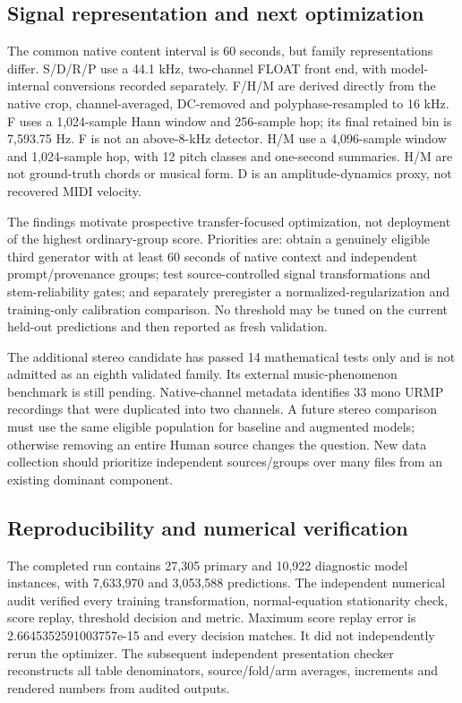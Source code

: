 \subsection{Signal representation and next optimization}

The common native content interval is 60 seconds, but family representations differ. S/D/R/P use a 44.1 kHz, two-channel FLOAT front end, with model-internal conversions recorded separately. F/H/M are derived directly from the native crop, channel-averaged, DC-removed and polyphase-resampled to 16 kHz. F uses a 1,024-sample Hann window and 256-sample hop; its final retained bin is 7,593.75 Hz. F is not an above-8-kHz detector. H/M use a 4,096-sample window and 1,024-sample hop, with 12 pitch classes and one-second summaries. H/M are not ground-truth chords or musical form. D is an amplitude-dynamics proxy, not recovered MIDI velocity.

The findings motivate prospective transfer-focused optimization, not deployment of the highest ordinary-group score. Priorities are: obtain a genuinely eligible third generator with at least 60 seconds of native context and independent prompt/provenance groups; test source-controlled signal transformations and stem-reliability gates; and separately preregister a normalized-regularization and training-only calibration comparison. No threshold may be tuned on the current held-out predictions and then reported as fresh validation.

The additional stereo candidate has passed 14 mathematical tests only and is not admitted as an eighth validated family. Its external music-phenomenon benchmark is still pending. Native-channel metadata identifies 33 mono URMP recordings that were duplicated into two channels. A future stereo comparison must use the same eligible population for baseline and augmented models; otherwise removing an entire Human source changes the question. New data collection should prioritize independent sources/groups over many files from an existing dominant component.

\subsection{Reproducibility and numerical verification}

The completed run contains 27,305 primary and 10,922 diagnostic model instances, with 7,633,970 and 3,053,588 predictions. The independent numerical audit verified every training transformation, normal-equation stationarity check, score replay, threshold decision and metric. Maximum score replay error is 2.6645352591003757e-15 and every decision matches. It did not independently rerun the optimizer. The subsequent independent presentation checker reconstructs all table denominators, source/fold/arm averages, increments and rendered numbers from audited outputs.

